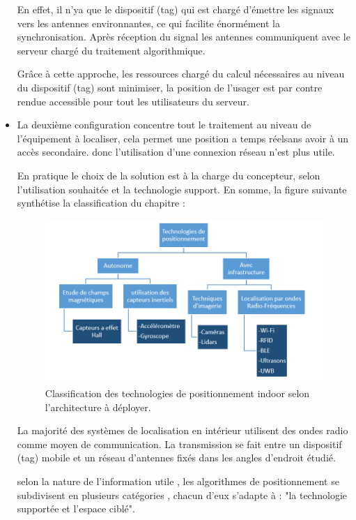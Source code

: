 \documentclass[12pt,a4paper]{report}
\begin{document}
\begin{itemize}
En effet, il n'ya que le dispositif (tag) qui est chargé d’émettre les signaux  vers les antennes environnantes, ce qui facilite énormément la synchronisation. Après réception du signal les antennes communiquent avec le serveur chargé du traitement algorithmique.


Grâce à cette approche, les ressources chargé du calcul nécessaires au niveau du dispositif (tag) sont minimiser, la position de l’usager est par contre rendue accessible pour tout les utilisateurs du serveur.

\item La deuxième configuration concentre tout le traitement au niveau de l’équipement à localiser, cela permet une position a temps réelsans avoir à un accès secondaire.
donc l'utilisation d'une connexion réseau n'est plus utile.


En pratique le choix de la solution est à la charge du concepteur, selon l’utilisation souhaitée et la technologie support. En somme, la figure suivante synthétise la classification du chapitre :

	\begin{figure}[H]
	\centering
	\includegraphics[width=1\linewidth]{Pics/techniques.PNG}
	\caption{Classification des technologies de positionnement indoor selon l’architecture à déployer.}
	\label{fig:techniques}
	
\end{figure}

La majorité des systèmes de localisation en intérieur utilisent des ondes radio comme moyen de communication. La transmission se fait entre un dispositif (tag) mobile et un réseau d’antennes fixés dans les angles d’endroit étudié.

selon la nature de l’information utile , les algorithmes de positionnement se subdivisent en plusieurs catégories , chacun d'eux s'adapte à : "la technologie supportée et l'espace ciblé".



\end{itemize}
\end{document}
